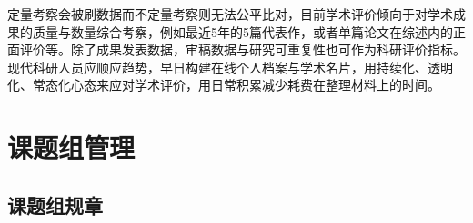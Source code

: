 \documentclass[]{tufte-book}
\begin{document}
定量考察会被刷数据而不定量考察则无法公平比对，目前学术评价倾向于对学术成果的质量与数量综合考察，例如最近5年的5篇代表作，或者单篇论文在综述内的正面评价等。除了成果发表数据，审稿数据与研究可重复性也可作为科研评价指标。现代科研人员应顺应趋势，早日构建在线个人档案与学术名片，用持续化、透明化、常态化心态来应对学术评价，用日常积累减少耗费在整理材料上的时间。

\hypertarget{ux8bfeux9898ux7ec4ux7ba1ux7406}{%
\section{课题组管理}\label{ux8bfeux9898ux7ec4ux7ba1ux7406}}

\hypertarget{ux8bfeux9898ux7ec4ux89c4ux7ae0}{%
\subsection{课题组规章}\label{ux8bfeux9898ux7ec4ux89c4ux7ae0}}
\end{document}
